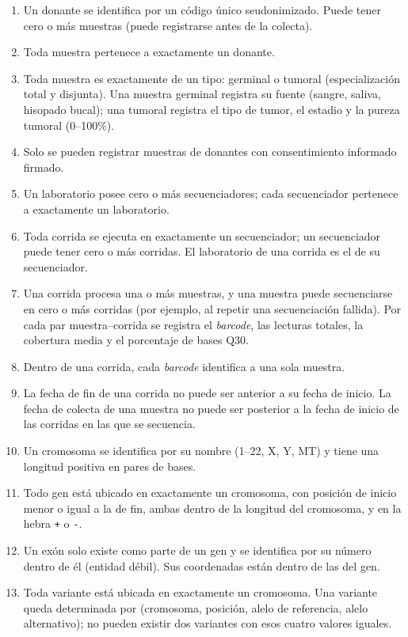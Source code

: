 \documentclass[11pt,a4paper]{article}
\newcommand{\tb}[1]{\texttt{#1}}
\begin{document}
\begin{enumerate}[label=\textbf{RS\arabic*.}]
  \item Un donante se identifica por un código único seudonimizado. Puede tener cero o más muestras (puede registrarse antes de la colecta).
  \item Toda muestra pertenece a exactamente un donante.
  \item Toda muestra es exactamente de un tipo: germinal o tumoral (especialización total y disjunta). Una muestra germinal registra su fuente (sangre, saliva, hisopado bucal); una tumoral registra el tipo de tumor, el estadio y la pureza tumoral (0--100\%).
  \item Solo se pueden registrar muestras de donantes con consentimiento informado firmado.
  \item Un laboratorio posee cero o más secuenciadores; cada secuenciador pertenece a exactamente un laboratorio.
  \item Toda corrida se ejecuta en exactamente un secuenciador; un secuenciador puede tener cero o más corridas. El laboratorio de una corrida es el de su secuenciador.
  \item Una corrida procesa una o más muestras, y una muestra puede secuenciarse en cero o más corridas (por ejemplo, al repetir una secuenciación fallida). Por cada par muestra--corrida se registra el \emph{barcode}, las lecturas totales, la cobertura media y el porcentaje de bases Q30.
  \item Dentro de una corrida, cada \emph{barcode} identifica a una sola muestra.
  \item La fecha de fin de una corrida no puede ser anterior a su fecha de inicio. La fecha de colecta de una muestra no puede ser posterior a la fecha de inicio de las corridas en las que se secuencia.
  \item Un cromosoma se identifica por su nombre (1--22, X, Y, MT) y tiene una longitud positiva en pares de bases.
  \item Todo gen está ubicado en exactamente un cromosoma, con posición de inicio menor o igual a la de fin, ambas dentro de la longitud del cromosoma, y en la hebra \tb{+} o \tb{-}.
  \item Un exón solo existe como parte de un gen y se identifica por su número dentro de él (entidad débil). Sus coordenadas están dentro de las del gen.
  \item Toda variante está ubicada en exactamente un cromosoma. Una variante queda determinada por (cromosoma, posición, alelo de referencia, alelo alternativo); no pueden existir dos variantes con esos cuatro valores iguales.

\end{enumerate}
\end{document}
